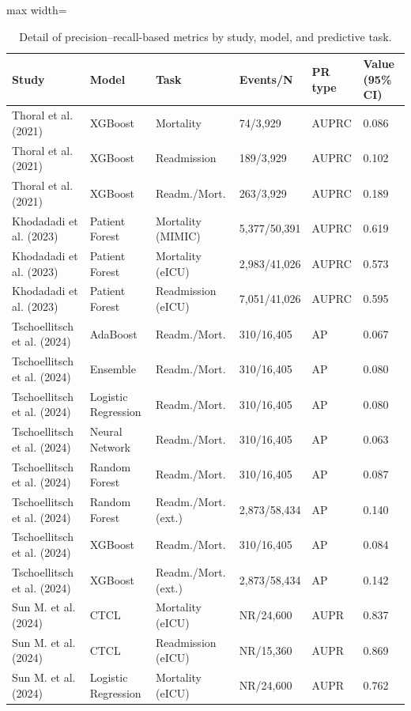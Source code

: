 \begin{table}[H]
\centering
\caption{Detail of precision--recall-based metrics by study, model, and predictive task.}\label{tab:detalle_pr}
\small
\begin{adjustbox}{max width=\textwidth}
\begin{tabular}{llllll}
\toprule
\textbf{Study} & \textbf{Model} & \textbf{Task} & \textbf{Events/N} & \textbf{PR type} & \textbf{Value (95\% CI)} \\
\midrule
    Thoral et al. (2021) & XGBoost & Mortality & 74/3,929 & AUPRC & 0.086 \\
    Thoral et al. (2021) & XGBoost & Readmission & 189/3,929 & AUPRC & 0.102 \\
    Thoral et al. (2021) & XGBoost & Readm./Mort. & 263/3,929 & AUPRC & 0.189 \\
    Khodadadi et al. (2023) & Patient Forest & Mortality (MIMIC) & 5,377/50,391 & AUPRC & 0.619 \\
    Khodadadi et al. (2023) & Patient Forest & Mortality (eICU) & 2,983/41,026 & AUPRC & 0.573 \\
    Khodadadi et al. (2023) & Patient Forest & Readmission (eICU) & 7,051/41,026 & AUPRC & 0.595 \\
    Tschoellitsch et al. (2024) & AdaBoost & Readm./Mort. & 310/16,405 & AP & 0.067 \\
    Tschoellitsch et al. (2024) & Ensemble & Readm./Mort. & 310/16,405 & AP & 0.080 \\
    Tschoellitsch et al. (2024) & Logistic Regression & Readm./Mort. & 310/16,405 & AP & 0.080 \\
    Tschoellitsch et al. (2024) & Neural Network & Readm./Mort. & 310/16,405 & AP & 0.063 \\
    Tschoellitsch et al. (2024) & Random Forest & Readm./Mort. & 310/16,405 & AP & 0.087 \\
    Tschoellitsch et al. (2024) & Random Forest & Readm./Mort. (ext.) & 2,873/58,434 & AP & 0.140 \\
    Tschoellitsch et al. (2024) & XGBoost & Readm./Mort. & 310/16,405 & AP & 0.084 \\
    Tschoellitsch et al. (2024) & XGBoost & Readm./Mort. (ext.) & 2,873/58,434 & AP & 0.142 \\
    Sun M. et al. (2024) & CTCL & Mortality (eICU) & NR/24,600 & AUPR & 0.837 \\
    Sun M. et al. (2024) & CTCL & Readmission (eICU) & NR/15,360 & AUPR & 0.869 \\
    Sun M. et al. (2024) & Logistic Regression & Mortality (eICU) & NR/24,600 & AUPR & 0.762 \\

\end{tabular}
\end{adjustbox}
\end{table}

